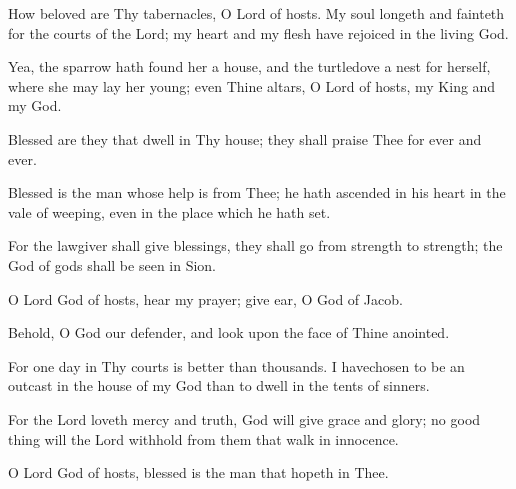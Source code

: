How beloved are Thy tabernacles, O Lord of hosts. My soul longeth and fainteth for the courts of the Lord; my heart and my flesh have rejoiced in the living God.

Yea, the sparrow hath found her a house, and the turtledove a nest for herself, where she may lay her young; even Thine altars, O Lord of hosts, my King and my God.

Blessed are they that dwell in Thy house; they shall praise Thee for ever and ever.

Blessed is the man whose help is from Thee; he hath ascended in his heart in the vale of weeping, even in the place which he hath set.

For the lawgiver shall give blessings, they shall go from strength to strength; the God of gods shall be seen in Sion.

O Lord God of hosts, hear my prayer; give ear, O God of Jacob.

Behold, O God our defender, and look upon the face of Thine anointed.

For one day in Thy courts is better than thousands. I havechosen to be an outcast in the house of my God than to dwell in the tents of sinners.

For the Lord loveth mercy and truth, God will give grace and glory; no good thing will the Lord withhold from them that walk in innocence.

O Lord God of hosts, blessed is the man that hopeth in Thee.
